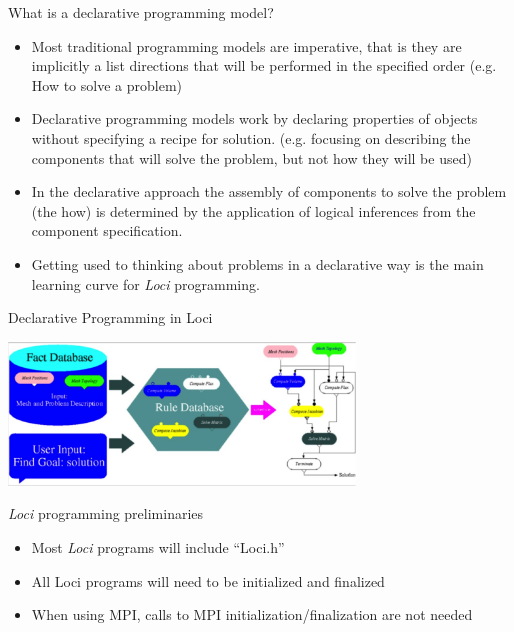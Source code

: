 \documentclass{beamer}
\begin{document}
\begin{frame}{What is a declarative programming model?}
\begin{itemize}
\item Most traditional programming models are imperative, that is they are implicitly a list directions that will be performed in the specified order (e.g. How to solve a problem)
\item Declarative programming models work by declaring properties of objects without specifying a recipe for solution.  (e.g. focusing on describing the components that will solve the problem, but not how they will be used)
\item In the declarative approach the assembly of components to solve the problem (the how) is determined by the application of logical inferences from the component specification.
\item Getting used to thinking about problems in a declarative way is the main learning curve for {\it Loci} programming.
\end{itemize}
\end{frame}
\begin{frame}{Declarative Programming in Loci}
\begin{center}
\includegraphics[height=1.5in]{Loci}
\end{center}
\end{frame}
\begin{frame}{{\it Loci} programming preliminaries}
\begin{itemize}
 \item Most {\it Loci} programs will include ``Loci.h''
 \item All Loci programs will need to be initialized and finalized
 \item When using MPI, calls to MPI initialization/finalization are not needed
\end{itemize}
\end{frame}
\end{document}
